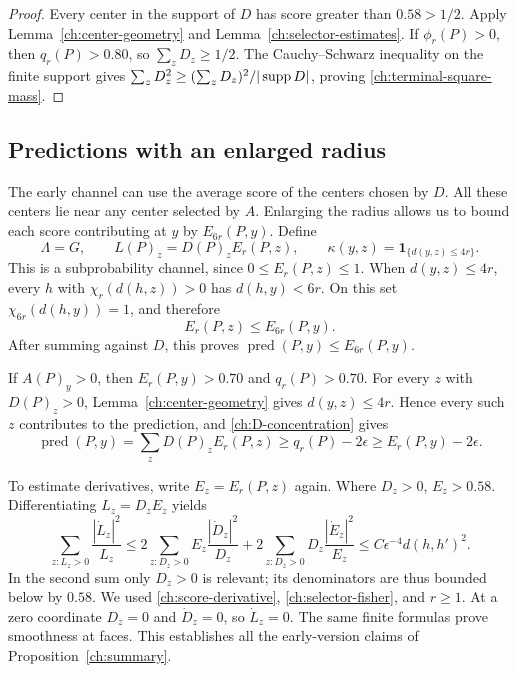 \begin{proof}
Every center in the support of $D$ has score greater than $0.58>1/2$.
Apply Lemma~\ref{ch:center-geometry} and
Lemma~\ref{ch:selector-estimates}.  If $\phi_r(P)>0$, then
$q_r(P)>0.80$, so $\sum_zD_z\ge1/2$.  The Cauchy--Schwarz inequality on
the finite support gives
$\sum_zD_z^2\ge(\sum_zD_z)^2/|\operatorname{supp} D|$, proving
\eqref{ch:terminal-square-mass}.
\end{proof}

\subsection{Predictions with an enlarged radius}

The early channel can use the average score of the centers chosen by $D$.
All these centers lie near any center selected by $A$.  Enlarging the radius
allows us to bound each score contributing at $y$ by $E_{6r}(P,y)$.
Define
\begin{equation}
 \Lambda=G,\qquad
 L(P)_z=D(P)_zE_r(P,z),\qquad
 \kappa(y,z)=\mathbf1_{\{d(y,z)\le4r\}}.
 \label{ch:early-channel}
\end{equation}
This is a subprobability channel, since $0\le E_r(P,z)\le1$.
When $d(y,z)\le4r$, every $h$ with $\chi_r(d(h,z))>0$ has
$d(h,y)<6r$.  On this set $\chi_{6r}(d(h,y))=1$, and therefore
\begin{equation}
 E_r(P,z)\le E_{6r}(P,y).
 \label{ch:radius-domination}
\end{equation}
After summing against $D$, this proves
$\operatorname{pred}(P,y)\le E_{6r}(P,y)$.

If $A(P)_y>0$, then $E_r(P,y)>0.70$ and $q_r(P)>0.70$.  For every
$z$ with $D(P)_z>0$, Lemma~\ref{ch:center-geometry} gives
$d(y,z)\le4r$.  Hence every such $z$ contributes to the prediction, and
\eqref{ch:D-concentration} gives
\[
 \operatorname{pred}(P,y)
 =\sum_zD(P)_zE_r(P,z)
 \ge q_r(P)-2\epsilon
 \ge E_r(P,y)-2\epsilon.
\]

To estimate derivatives, write $E_z=E_r(P,z)$ again.  Where $D_z>0$,
$E_z>0.58$.  Differentiating $L_z=D_zE_z$ yields
\begin{equation}
 \sum_{z:L_z>0}\frac{|\dot L_z|^2}{L_z}
 \le 2\sum_{z:D_z>0}E_z\frac{|\dot D_z|^2}{D_z}
       +2\sum_{z:D_z>0}D_z\frac{|\dot E_z|^2}{E_z}
 \le C\epsilon^{-4}d(h,h')^2.
 \label{ch:early-fisher}
\end{equation}
In the second sum only $D_z>0$ is relevant; its denominators are thus bounded
below by $0.58$.  We used \eqref{ch:score-derivative},
\eqref{ch:selector-fisher}, and $r\ge1$.  At a zero coordinate $D_z=0$
and $\dot D_z=0$, so $\dot L_z=0$.  The same finite formulas prove
smoothness at faces.  This establishes all the early-version claims of
Proposition~\ref{ch:summary}.

